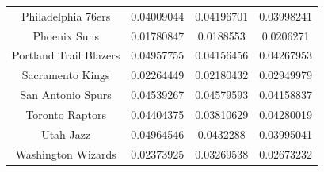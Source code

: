 \documentclass[12pt]{article}%
\begin{document}
\begin{center}
\begin{tabular}{|c|c|c|c|}
Philadelphia 76ers&0.04009044 &0.04196701 &0.03998241\\
Phoenix Suns&0.01780847 &0.0188553  &0.0206271 \\
Portland Trail Blazers&0.04957755 &0.04156456 &0.04267953\\
Sacramento Kings&0.02264449 &0.02180432 &0.02949979\\
San Antonio Spurs &0.04539267 &0.04579593 &0.04158837\\
Toronto Raptors&0.04404375 &0.03810629 &0.04280019\\
Utah Jazz&0.04964546 &0.0432288  &0.03995041\\
Washington Wizards&0.02373925 &0.03269538 &0.02673232\\
\hline
\end{tabular}
\end{center}
\end{document}
